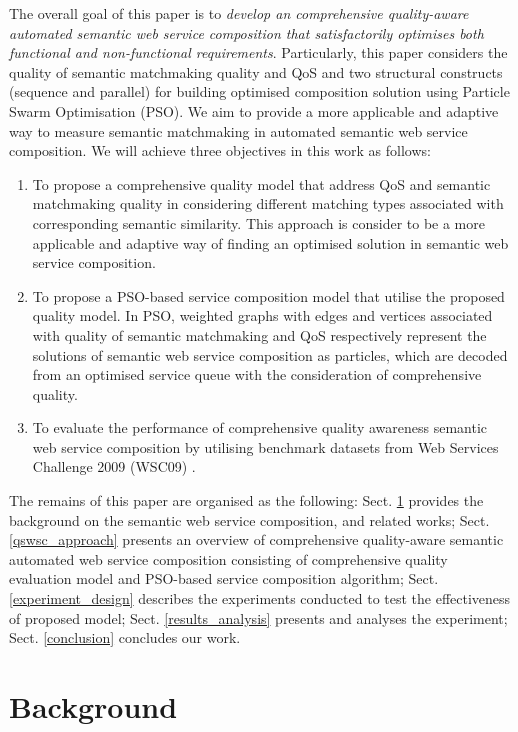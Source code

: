 \documentclass{llncs}
\begin{document}
The overall goal of this paper is to \textit{develop an comprehensive quality-aware automated semantic web service composition that satisfactorily optimises both functional and non-functional requirements}. Particularly, this paper considers the quality of semantic matchmaking quality and QoS and two structural constructs (sequence and parallel) for building optimised composition solution using Particle Swarm Optimisation (PSO). We aim to provide a more applicable and adaptive way to measure semantic matchmaking in automated semantic web service composition. We will achieve three objectives in this work as follows:

\begin{enumerate}
 \item To propose a comprehensive quality model that address QoS and semantic matchmaking quality in considering different matching types associated with corresponding semantic similarity. This approach is consider to be a more applicable and adaptive way of finding an optimised solution in semantic web service composition.
  
 \item To propose a PSO-based service composition model that utilise the proposed quality model. In PSO, weighted graphs with edges and vertices associated with quality of semantic matchmaking and QoS respectively represent the solutions of semantic web service composition as particles, which are decoded from an optimised service queue with the consideration of comprehensive quality.
  
 \item To evaluate the performance of comprehensive quality awareness semantic web service composition by utilising benchmark datasets from Web Services Challenge 2009 (WSC09) \cite{kona2009wsc}.
\end{enumerate}

The remains of this paper are organised as the following: Sect. \ref{background} provides the background on the semantic web service composition, and related works; Sect. \ref{qswsc_approach} presents an overview of comprehensive quality-aware semantic automated web service composition consisting of comprehensive quality evaluation model and PSO-based service composition algorithm; Sect. \ref{experiment_design} describes the experiments conducted to test the effectiveness of proposed model; Sect. \ref{results_analysis} presents and analyses the experiment; Sect. \ref{conclusion} concludes our work.


\section{Background}\label{background}
\end{document}
